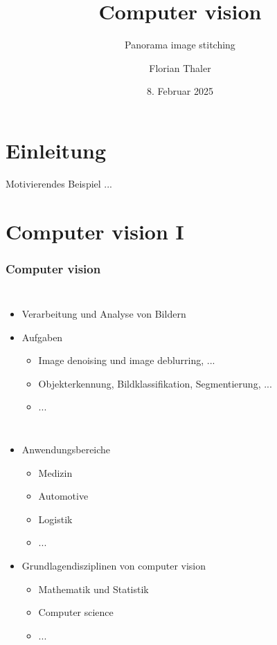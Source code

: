 \documentclass[aspectratio=43, 11pt]{beamer}
\title[Short Title]{Computer vision}
\subtitle{Panorama image stitching}
\author{Florian Thaler}
\date{8. Februar 2025}
\institute{Institute of Visual Computing}
\begin{document}
	\begin{frame}[plain]
  	\maketitle
	\end{frame}



	\section{Einleitung}
	
		\begin{frame}{Motivierendes Beispiel}
	  	...
		\end{frame}


	\section{Computer vision I}

		\begin{frame}
			\frametitle{Computer vision}
			\begin{columns}
					\begin{itemize}
		 		  	\item Verarbeitung und Analyse von Bildern
						\item Aufgaben
							\begin{itemize}
								\item Image denoising und image deblurring, ...
								\item Objekterkennung, Bildklassifikation, Segmentierung, ...
								\item ...
							\end{itemize}
					\end{itemize}
			\end{columns}
	  	\begin{itemize}
				\item Anwendungsbereiche
					\begin{itemize}
						\item Medizin
						\item Automotive
						\item Logistik
						\item ...
					\end{itemize}
				\item Grundlagendisziplinen von computer vision
					\begin{itemize}
						\item Mathematik und Statistik
						\item Computer science
						\item ...
					\end{itemize}
		  \end{itemize}
		\end{frame}
\end{document}
